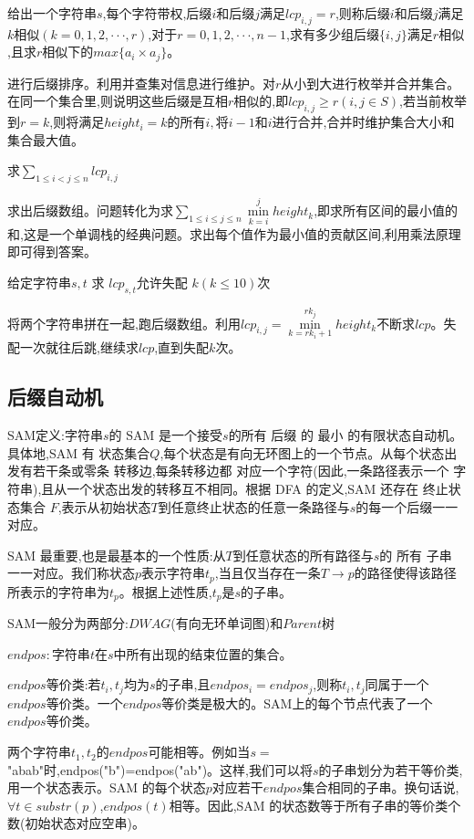 \documentclass[a4paper]{ctexart}
\begin{document}
给出一个字符串$s$,每个字符带权,后缀$i$和后缀$j$满足$lcp_{i,j}=r$,则称后缀$i$和后缀$j$满足$k相似(k=0,1,2,···,r)$,对于$r=0,1,2,···,n-1$,求有多少组后缀$\{i,j\}$满足$r相似$,且求$r相似下的$$max\{a_i\times a_j\}$。

进行后缀排序。利用并查集对信息进行维护。对$r$从小到大进行枚举并合并集合。在同一个集合里,则说明这些后缀是互相$r相似的$,即$lcp_{i,j}\ge r(i,j\in S)$,若当前枚举到$r=k$,则将满足$height_i=k的所有i,将i-1和i进行合并$,合并时维护集合大小和集合最大值。

求$\sum\limits_{1\le i<j\le n}lcp_{i,j}$

求出后缀数组。问题转化为求$\sum\limits_{1\le i\le j\le n}\min\limits_{k=i}^jheight_{k}$,即求所有区间的最小值的和,这是一个单调栈的经典问题。求出每个值作为最小值的贡献区间,利用乘法原理即可得到答案。

给定字符串$s,t$ 求 $lcp_{s,t}$允许失配 $k(k\le 10)$次

将两个字符串拼在一起,跑后缀数组。利用$lcp_{i,j}=\min\limits_{k=rk_i+1}^{rk_j}height_k$不断求$lcp$。失配一次就往后跳,继续求$lcp$,直到失配$k$次。

\subsection{后缀自动机}

SAM定义:字符串$s$的 SAM 是一个接受$s$的所有 后缀 的 最小 的有限状态自动机。具体地,SAM 有 状态集合$Q$,每个状态是有向无环图上的一个节点。从每个状态出发有若干条或零条 转移边,每条转移边都 对应一个字符(因此,一条路径表示一个 字符串),且从一个状态出发的转移互不相同。根据 DFA 的定义,SAM 还存在 终止状态集合 $F$,表示从初始状态$T$到任意终止状态的任意一条路径与$s$的每一个后缀一一对应。

SAM 最重要,也是最基本的一个性质:从$T$到任意状态的所有路径与$s$的 所有 子串 一一对应。我们称状态$p$表示字符串$t_p$,当且仅当存在一条$T\rightarrow p$的路径使得该路径所表示的字符串为$t_p$。根据上述性质,$t_p$是$s$的子串。

SAM一般分为两部分:$DWAG$(有向无环单词图)和$Parent$树

$endpos:$字符串$t$在$s$中所有出现的结束位置的集合。

$endpos$等价类:若$t_i,t_j$均为$s$的子串,且$endpos_i=endpos_j$,则称$t_i,t_j$同属于一个$endpos$等价类。一个$endpos$等价类是极大的。SAM上的每个节点代表了一个$endpos$等价类。

两个字符串$t_1,t_2$的$endpos$可能相等。例如当$s=$"abab"时,endpos("b")=endpos("ab")。这样,我们可以将$s$的子串划分为若干等价类,用一个状态表示。SAM 的每个状态$p$对应若干$endpos$集合相同的子串。换句话说,$∀t∈substr(p)$,$endpos(t)$相等。因此,SAM 的状态数等于所有子串的等价类个数(初始状态对应空串)。
\end{document}
